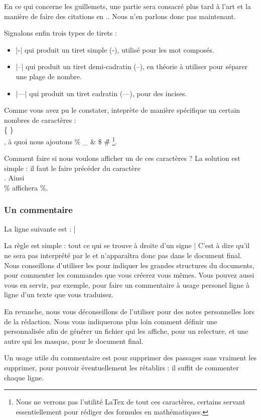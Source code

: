 En ce qui concerne les guillemets, une partie sera consacré plus tard à l'art et la manière de faire des citations en .. Nous n'en parlons donc pas maintenant.

Signalons enfin trois types de tirets :
\begin{itemize}
\item {}|-| qui produit un tiret simple (-), utilisé pour les mot composés.
\item {}|--| qui produit un tiret demi-cadratin (--), en théorie à utiliser pour séparer une plage de nombre.
\item {}|---| qui produit un tiret cadratin (---), pour des incises.
\end{itemize}
 

Comme vous avez pu le constater,  inteprète de manière spécifique un certain nombres de caractères : \\ \{ \} \[ \], à quoi nous ajoutons \% \_ \& \$ \~ \# \footnote{Nous ne verrons pas l'utilité LaTex de tout ces caractères, certains servant essentiellement pour rédiger des formules en mathématiques.}.

Comment faire si nous voulons afficher un de ces caractères ? La solution est simple : il faut le faire précéder du caractère \\. Ainsi \\\% affichera \%.   


\subsubsection{Un commentaire}

La ligne suivante est : |%

La règle est simple : tout ce qui se trouve à droite d'un signe |%
C'est à dire qu'il ne sera pas interprété par le  et n'apparaîtra donc pas dans le document final. Nous conseillons d'utiliser les  pour indiquer les grandes structures du documents, pour commenter les commandes que vous créerez vous mêmes. Vous pouvez aussi vous en servir, par exemple, pour faire un commentaire à usage personel ligne à ligne d'un texte que vous traduisez.

En revanche, nous vous déconseillons de l'utiliser pour des notes personnelles lors de la rédaction. Nous vous indiquerons plus loin  comment définir une  personnalisée afin de générer un fichier qui les affiche, pour un relecture, et une autre qui les masque, pour le document final.

Un usage utile du commentaire est pour supprimer des passages sans vraiment les supprimer, pour pouvoir éventuellement les rétablirs : il suffit de commenter chaque ligne.


